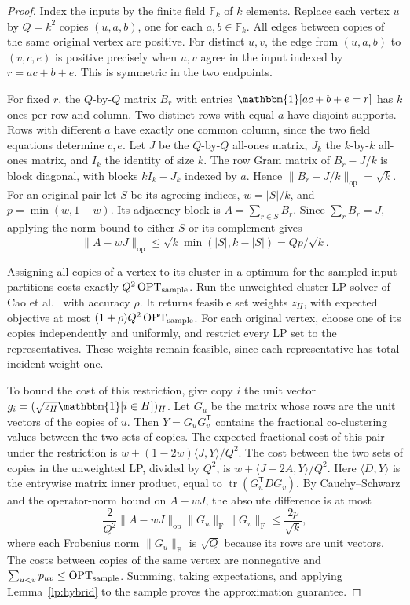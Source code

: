 \documentclass[11pt]{article}
\begin{document}
\begin{proof}
Index the inputs by the finite field $\mathbb F_k$ of $k$ elements.
Replace each vertex $u$ by $Q=k^2$ copies $(u,a,b)$, one for each
$a,b\in\mathbb F_k$. All edges between copies of the same original vertex are positive. For distinct $u,v$, the edge from $(u,a,b)$ to
$(v,c,e)$ is positive precisely when $u,v$ agree in the input indexed
by $r=ac+b+e$. This is symmetric in the two endpoints.

For fixed $r$, the $Q$-by-$Q$ matrix $B_r$ with entries
$\mathbbm{1}[ac+b+e=r]$ has $k$ ones per row and column. Two distinct rows
with equal $a$ have disjoint supports. Rows with different $a$ have
exactly one common column, since the two field equations determine
$c,e$. Let $J$ be the $Q$-by-$Q$ all-ones matrix, $J_k$ the
$k$-by-$k$ all-ones matrix, and $I_k$ the identity of size $k$.
The row Gram matrix of $B_r-J/k$ is block diagonal, with blocks
$kI_k-J_k$ indexed by $a$.
Hence $\|B_r-J/k\|_{\mathrm{op}}=\sqrt{k}$. For an original pair let
$S$ be its agreeing indices, $w=|S|/k$, and $p=\min(w,1-w)$. Its
adjacency block is $A=\sum_{r\in S}B_r$. Since $\sum_rB_r=J$, applying
the norm bound to either $S$ or its complement gives
\[
 \|A-wJ\|_{\mathrm{op}}\le\sqrt{k}\min(|S|,k-|S|)
 = Qp/\sqrt{k}.
\]

Assigning all copies of a vertex to its cluster in a optimum for the sampled input partitions
costs exactly $Q^2\operatorname{OPT}_{\rm sample}$. Run the unweighted
cluster LP solver of Cao et al.~\cite[Theorem 1]{clusterLP25} with
accuracy $\rho$. It returns feasible set weights $z_H$, with expected
objective at most $(1+\rho)Q^2\operatorname{OPT}_{\rm sample}$.
For each original vertex, choose one of its copies independently and uniformly,
and restrict every LP set to the representatives. These weights remain
feasible, since each representative has total incident weight one.

To bound the cost of this restriction, give copy $i$ the unit vector
$g_i=(\sqrt{z_H}\mathbbm{1}[i\in H])_H$. Let $G_u$ be the matrix
whose rows are the unit vectors of the copies of $u$. Then
$Y=G_uG_v^{\mathsf T}$ contains the fractional co-clustering values between
the two sets of copies. The expected
fractional cost of this pair under the restriction is
$w+(1-2w)\langle J,Y\rangle/Q^2$. The cost between the two sets of copies in the unweighted LP, divided by
$Q^2$, is $w+\langle J-2A,Y\rangle/Q^2$. Here $\langle D,Y\rangle$
is the entrywise matrix inner product, equal to
$\operatorname{tr}(G_u^{\mathsf T}DG_v)$. By Cauchy--Schwarz and
the operator-norm bound on $A-wJ$, the absolute difference is at most
\[
 \frac{2}{Q^2}\|A-wJ\|_{\mathrm{op}}
       \|G_u\|_{\mathrm F}\|G_v\|_{\mathrm F}
 \le \frac{2p}{\sqrt k},
\]
where each Frobenius norm $\|G_u\|_{\mathrm F}$ is $\sqrt Q$
because its rows are unit vectors.
The costs between copies of the same vertex are nonnegative and
$\sum_{u<v}p_{uv}\le\operatorname{OPT}_{\rm sample}$. Summing,
taking expectations, and applying Lemma~\ref{lp:hybrid} to the sample
proves the approximation guarantee.


\end{proof}
\end{document}
